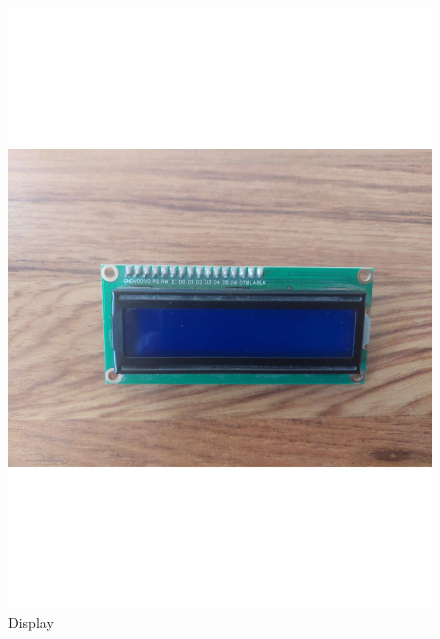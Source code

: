     \begin{figure}[H]
        \centering
        \includegraphics[trim = {30mm 30mm 30mm 30mm},clip,scale=0.2]{10/Img/display.pdf}
        \caption{Display}
        \label{Display}
    \end{figure}
    
